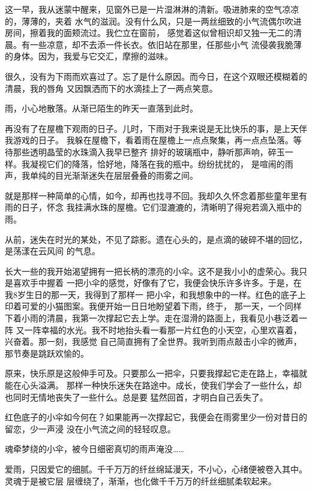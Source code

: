		这一早，我从迷蒙中醒来，见窗外已是一片湿淋淋的清新。吸进肺来的空气凉凉的，薄薄的，夹着
	水气的滋润。没有什么风，只是一两丝细致的小气流偶尔吹进房间，擦着我的面颊流过。我伫立在窗前，
	感觉着这似曾相识却又独一无二的清晨。有一些凉意，却不去添一件长衣。依旧站在那里，任那些小气
	流侵袭我脆薄的身体。因为，我爱与它交汇，摩擦的滋味。

		很久，没有为下雨而欢喜过了。忘了是什么原因。而今日，在这个双眼还模糊着的清晨，我的唇角
	又因飘洒而下的水滴挂上了一两点笑意。

		雨，小心地散落。从渐已陌生的昨天一直落到此时。

		再没有了在屋檐下观雨的日子。儿时，下雨对于我来说是无比快乐的事，是上天伴我游戏的日子。
	我躲在屋檐下，看着雨在屋檐上一点点聚集，再一点点坠落。等待那些透明晶莹的水珠滴入我早已整齐
	排好的玻璃瓶中，静听那声响，碎玉一样。我凝视它们的降落，恰好地，降落在我的瓶中。纷纷扰扰的，
	是喧闹的雨声，我单纯的目光渐渐迷失在层层叠叠的雨雾之间。

		就是那样一种简单的心情，如今，却再也找寻不回。我却久久怀念着那些童年里有雨的日子，怀念
	我挂满水珠的屋檐。它们湿漉漉的，清晰明了得宛若滴入瓶中的雨。

		从前，迷失在时光的某处，不见了踪影。遗在心头的，是点滴的破碎不堪的回忆，是荡漾在云风间
	的气息。

		长大一些的我开始渴望拥有一把长柄的漂亮的小伞。这不是我小小的虚荣心。我只是喜欢手中握着
	一把小伞的感觉，好像有了它，我便会快乐许多许多。于是，在我8岁生日的那一天，我得到了那样一
	把小伞，和我想象中的一样。红色的底子上印着可爱的小猫图案。我便开始一日日地盼望着下雨，终于，
	那一天，一个同样下着小雨的清晨，我第一次撑起它去上学。走在湿滑的路面上，我看见小巷泛着一阵
	又一阵幸福的水光。我不时地抬头看一看那一片红色的小天空，心里欢喜着，兴奋着。那一刻，我感觉
	自己简直拥有了全世界。我听到雨点敲击小伞的微声，那节奏是跳跃欢愉的。

		原来，快乐原是这般伸手可及。只要那么一把伞，只要我撑起它走在路上，幸福就能在心头溢满。
	那样一种快乐迷失在路途中。成长，使我们学会了一些什么，却也同时无情地丧失了一些什么。总是要
	猛然回首，才明白自己丢失了。

		红色底子的小伞如今何在？如果能再一次撑起它，我便会在雨雾里少一份对昔日的留恋，少一声浸
	没在小气流之间的轻轻叹息。

		魂牵梦绕的小伞，被今日细密真切的雨声淹没……

		爱雨，只因爱它的细腻。千千万万的纤丝绵延漫天，不小心，心绪便被卷入其中。灵魂于是被它层
	层缠绕了，渐渐，也化做千千万万的纤丝细腻柔软起来。


